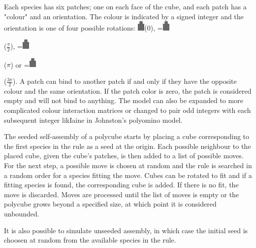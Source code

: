 Each species has six patches; one on each face of the cube, and each patch has a "colour" and an orientation. The colour is indicated by a signed integer and the orientation is one of four possible rotations: \includegraphics[width=10pt]{figures/face.eps}\hspace{4pt}(\(0\)),
\begingroup{}=\hbox{\includegraphics[width=10pt,angle=-90]{figures/face.eps}}\parbox{\wd0}{}\endgroup\hspace{4pt}(\(\frac{\pi}{2}\)),
\begingroup{}=\hbox{\includegraphics[width=10pt,angle=180]{figures/face.eps}}\parbox{\wd0}{}\endgroup\hspace{4pt}(\(\pi\)) or
\begingroup{}=\hbox{\includegraphics[width=10pt,angle=90]{figures/face.eps}}\parbox{\wd0}{}\endgroup\hspace{4pt}(\(\frac{3\pi}{2}\)). A patch can bind to another patch if and only if they have the opposite colour and the same orientation. If the patch color is zero, the patch is considered empty and will not bind to anything. The model can also be expanded to more complicated colour interaction matrices or changed to pair odd integers with each subsequent integer likIaine in Johnston's polyomino model\cite{ahnert2010self}\cite{johnston2011evolutionary}.

The seeded self-assembly of a polycube starts by placing a cube corresponding to the first species in the rule as a seed at the origin. Each possible neighbour to the placed cube, given the cube's patches, is then added to a list of possible moves. For the next step, a possible move is chosen at random and the rule is searched in a random order for a species fitting the move. Cubes can be rotated to fit and if a fitting species is found, the corresponding cube is added. If there is no fit, the move is discarded. Moves are processed until the list of moves is empty or the polycube grows beyond a specified size, at which point it is considered unbounded.

It is also possible to simulate unseeded assembly, in which case the initial seed is choosen at random from the available species in the rule.

